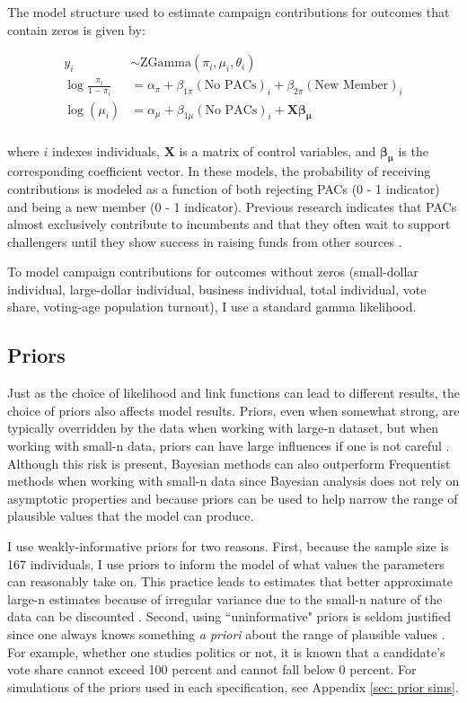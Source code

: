 \documentclass[12pt]{article}
\begin{document}
The model structure used to estimate campaign contributions for outcomes that contain zeros is given by: 

$$
\begin{aligned}
    y_i &\sim \text{ZGamma}(\pi_i, \mu_i, \theta_i) \\
    \log \frac{\pi_i}{1 - \pi_i} &= \alpha_{\pi} + \beta_{1\pi} (\text{No PACs})_i + \beta_{2\pi} (\text{New Member})_i \\
    \log(\mu_i) &= \alpha_{\mu} + \beta_{1\mu} (\text{No PACs})_i + \bm{X} \bm{\beta_{\mu}} \\
\end{aligned}
$$

\noindent where $i$ indexes individuals, $\bm{X}$ is a matrix of control variables, and $\bm{\beta_{\mu}}$ is the corresponding coefficient vector. In these models, the probability of receiving contributions is modeled as a function of both rejecting PACs (0 - 1 indicator) and being a new member (0 - 1 indicator). Previous research indicates that PACs almost exclusively contribute to incumbents \citep{brunell2005} and that they often wait to support challengers until they show success in raising funds from other sources \citep{biersack1993}. 

To model campaign contributions for outcomes without zeros (small-dollar individual, large-dollar individual, business individual, total individual, vote share, voting-age population turnout), I use a standard gamma likelihood.

\subsection{Priors}

Just as the choice of likelihood and link functions can lead to different results, the choice of priors also affects model results. Priors, even when somewhat strong, are typically overridden by the data when working with large-n dataset, but when working with small-n data, priors can have large influences if one is not careful \citep{mcneish2016}. Although this risk is present, Bayesian methods can also outperform Frequentist methods when working with small-n data since Bayesian analysis does not rely on asymptotic properties and because priors can be used to help narrow the range of plausible values that the model can produce. 

I use weakly-informative priors for two reasons. First, because the sample size is 167 individuals, I use priors to inform the model of what values the parameters can reasonably take on. This practice leads to estimates that better approximate large-n estimates because of irregular variance due to the small-n nature of the data can be discounted \citep{mcneish2016}. Second, using ``uninformative" priors is seldom justified since one always knows something \textit{a priori} about the range of plausible values \citep{gelman2008a}. For example, whether one studies politics or not, it is known that a candidate's vote share cannot exceed 100 percent and cannot fall below 0 percent. For simulations of the priors used in each specification, see Appendix \ref{sec: prior sims}.
\end{document}
